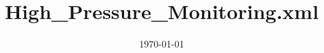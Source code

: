 \documentclass[11pt,a4paper]{article}
\begin{document}
\title{High\_Pressure\_Monitoring.xml}
\date{\today}
\maketitle


\end{document}
